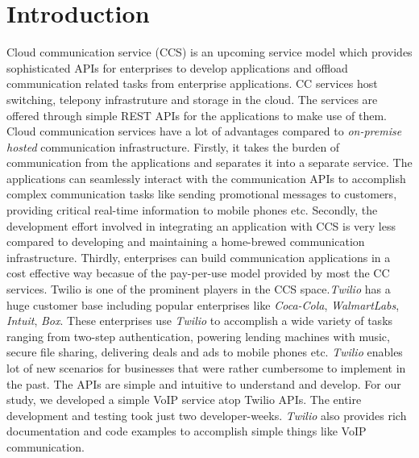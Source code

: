 \section{Introduction}
\label{sec-intro}
Cloud communication service (CCS) is an upcoming service model which provides sophisticated APIs for enterprises to develop applications and offload communication related tasks from enterprise applications. CC services host switching, telepony infrastruture and storage in the cloud. The services are offered through simple REST APIs for the applications to make use of them. Cloud communication services have a lot of advantages compared to \textit{on-premise hosted} communication infrastructure. Firstly, it takes the burden of communication from the applications and separates it into a separate service. The applications can seamlessly interact with the communication APIs to accomplish complex communication tasks like sending promotional messages to customers, providing critical real-time information to mobile phones etc. Secondly, the development effort involved in integrating an application with CCS is very less compared to developing and maintaining a home-brewed communication infrastructure.
Thirdly, enterprises can build communication applications in a cost effective way becasue of the pay-per-use model provided by most the CC services. {Twilio} is one of the prominent players in the CCS space.\textit{Twilio} has a huge customer base  including popular enterprises like \textit{Coca-Cola}, \textit{WalmartLabs}, \textit{Intuit}, \textit{Box}. These enterprises use \textit{Twilio} to accomplish a wide variety of tasks ranging from two-step authentication, powering lending machines with music, secure file sharing, delivering deals and ads to mobile phones etc. \textit{Twilio} enables lot of new scenarios for businesses that were rather cumbersome to implement in the past. The APIs are simple and intuitive to understand and develop. For our study, we developed a simple VoIP service atop Twilio APIs. The entire development and testing took just two developer-weeks. \textit{Twilio} also provides rich documentation and code examples to accomplish simple things like VoIP communication.